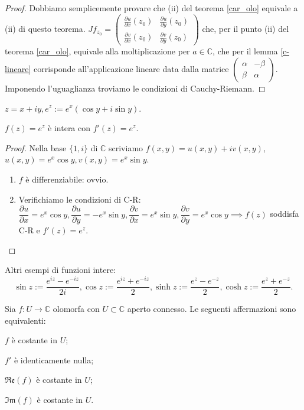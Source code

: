 \begin{proof}
  Dobbiamo semplicemente provare che (ii) del teorema \ref{car_olo} equivale a (ii) di questo teorema. $Jf_{z_0}=\begin{pmatrix}
    \frac{\partial u}{\partial x}(z_0) & \frac{\partial u}{\partial y}(z_0)\\
    \frac{\partial v}{\partial x}(z_0) & \frac{\partial v}{\partial y}(z_0)
\end{pmatrix}$ che, per il punto (ii) del teorema \ref{car_olo}, equivale alla moltiplicazione per $a \in \mathbb{C}$, che per il lemma \ref{c-lineare} corrisponde all'applicazione lineare data dalla matrice $\begin{pmatrix}
  \alpha & -\beta\\
  \beta & \alpha
\end{pmatrix}$. Imponendo l'uguaglianza troviamo le condizioni di Cauchy-Riemann.
\end{proof}

\begin{defn}
  $z=x+iy, e^z:=e^x(\cos{y}+i\sin{y})$.
\end{defn}

\begin{prop}
  $f(z)=e^z$ è intera con $f'(z)=e^z$.
\end{prop}

\begin{proof}
  Nella base $\{1, i\}$ di $\mathbb{C}$ scriviamo $f(x, y)=u(x, y)+iv(x, y)$, $u(x, y)=e^x\cos{y}, v(x, y)=e^x\sin{y}$.
  \begin{enumerate}
    \item $f$ è differenziabile: ovvio.
    \item Verifichiamo le condizioni di C-R:
    $\dfrac{\partial u}{\partial x}=e^x\cos{y}, \dfrac{\partial u}{\partial y}=-e^x\sin{y}, \dfrac{\partial v}{\partial x}=e^x\sin{y}, \dfrac{\partial v}{\partial y}=e^x\cos{y} \implies f(z)$ soddisfa C-R e $f'(z)=e^z$.
  \end{enumerate}
\end{proof}

\begin{ex}
  Altri esempi di funzioni intere:
  $$\sin{z}:=\dfrac{e^{iz}-e^{-iz}}{2i}, \cos{z}:=\dfrac{e^{iz}+e^{-iz}}{2}, \sinh{z}:=\dfrac{e^{z}-e^{-z}}{2}, \cosh{z}:=\dfrac{e^{z}+e^{-z}}{2}.$$
\end{ex}

\begin{cor}
  Sia $f:U \longrightarrow \mathbb{C}$ olomorfa con $U \subset \mathbb{C}$ aperto connesso. Le seguenti affermazioni sono equivalenti:
  \begin{nlist}
    \item $f$ è costante in $U$;
    \item $f'$ è identicamente nulla;
    \item $\mathfrak{Re}(f)$ è costante in $U$;
    \item $\mathfrak{Im}(f)$ è costante in $U$.
  \end{nlist}
\end{cor}


